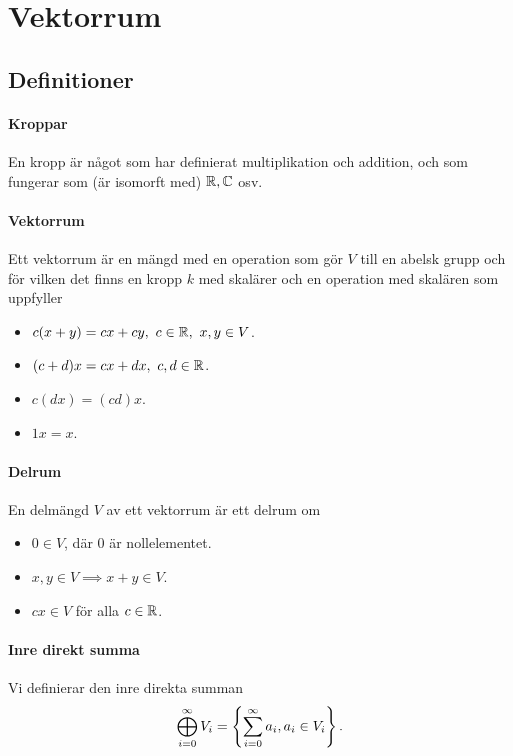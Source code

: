 \section{Vektorrum}

\subsection{Definitioner}

\paragraph{Kroppar}
En kropp är något som har definierat multiplikation och addition, och som fungerar som (är isomorft med) $\mathbb{R}, \mathbb{C}$ osv.

\paragraph{Vektorrum}
Ett vektorrum är en mängd med en operation som gör $V$ till en abelsk grupp och för vilken det finns en kropp $k$ med skalärer och en operation med skalären som uppfyller
\begin{itemize}
	\item $c(x + y) = cx + cy,~c\in\mathbb{R},~x,y\in V$.
	\item $(c + d)x = cx + dx,~c,d\in\mathbb{R}$.
	\item $c(dx) = (cd)x$.
	\item $1x = x$.
\end{itemize}

\paragraph{Delrum}
En delmängd $V$ av ett vektorrum är ett delrum om
\begin{itemize}
	\item $0\in V$, där $0$ är nollelementet.
	\item $x, y\in V\implies x + y\in V$.
	\item $cx\in V$ för alla $c\in\mathbb{R}$.
\end{itemize}

\paragraph{Inre direkt summa}
Vi definierar den inre direkta summan
\begin{align*}
	\bigoplus\limits_{i = 0}^{\infty}V_{i} = \left\{\sum\limits_{i = 0}^{\infty}a_{i}, a_{i}\in V_{i}\right\}.
\end{align*}

